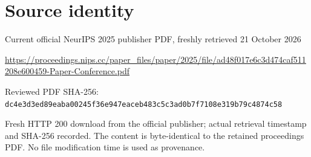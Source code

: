 \documentclass[11pt]{article}
\begin{document}
\section*{Source identity}

Current official NeurIPS 2025 publisher PDF, freshly retrieved 21 October 2026

\url{https://proceedings.nips.cc/paper_files/paper/2025/file/ad48f017e6c3d474caf511208e600459-Paper-Conference.pdf}

Reviewed PDF SHA-256: \nolinkurl{dc4e3d3ed89eaba00245f36e947eaceb483c5c3ad0b7f7108e319b79c4874c58}

Fresh HTTP 200 download from the official publisher; actual retrieval timestamp and SHA-256 recorded. The content is byte-identical to the retained proceedings PDF. No file modification time is used as provenance.
\end{document}
